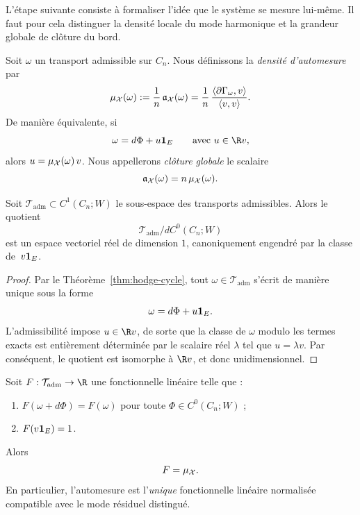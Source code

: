 L'étape suivante consiste à formaliser l'idée que le système se mesure lui-même. Il faut pour cela
distinguer la densité locale du mode harmonique et la grandeur globale de clôture du bord.

\begin{definition}
Soit $\omega$ un transport admissible sur $C_n$. Nous définissons la \emph{densité d'automesure}
par
\[
\mu_\mathcal X(\omega):=\frac{1}{n}\,\mathfrak a_\mathcal X(\omega)
=\frac{1}{n}\,\frac{\langle \partial\Gamma_\omega,v\rangle}{\langle v,v\rangle}.
\]
De manière équivalente, si
\[
\omega=d\Phi+u\oneE
\qquad\text{avec }u\in\R v,
\]
alors $u=\mu_\mathcal X(\omega)\,v$.
Nous appellerons \emph{clôture globale} le scalaire
\[
\mathfrak a_\mathcal X(\omega)=n\,\mu_\mathcal X(\omega).
\]
\end{definition}

\begin{lemma}\label{lem:one-dimensional-quotient}
Soit $\mathcal T_{\mathrm{adm}}\subset C^1(C_n;W)$ le sous-espace des transports admissibles. Alors
le quotient
\[
\mathcal T_{\mathrm{adm}}/dC^0(C_n;W)
\]
est un espace vectoriel réel de dimension $1$, canoniquement engendré par la classe de
$\,v\mathbf 1_E$.
\end{lemma}

\begin{proof}
Par le Théorème~\ref{thm:hodge-cycle}, tout $\omega\in\mathcal T_{\mathrm{adm}}$ s'écrit de manière
unique sous la forme
\[
\omega=d\Phi+u\mathbf 1_E.
\]
L'admissibilité impose $u\in\R v$, de sorte que la classe de $\omega$ modulo les termes exacts est
entièrement déterminée par le scalaire réel $\lambda$ tel que $u=\lambda v$. Par conséquent,
le quotient est isomorphe à $\R v$, et donc unidimensionnel.
\end{proof}

\begin{theorem}\label{thm:uniqueness-self-measurement}
Soit $F:\mathcal T_{\mathrm{adm}}\to\R$ une fonctionnelle linéaire telle que :
\begin{enumerate}[label=\textup{(\roman*)}]
\item $F(\omega+d\Phi)=F(\omega)$ pour toute $\Phi\in C^0(C_n;W)$ ;
\item $F(v\mathbf 1_E)=1$.
\end{enumerate}
Alors
\[
F=\mu_\mathcal X.
\]
En particulier, l'automesure est l'\emph{unique} fonctionnelle linéaire normalisée compatible avec le mode
résiduel distingué.
\end{theorem}

